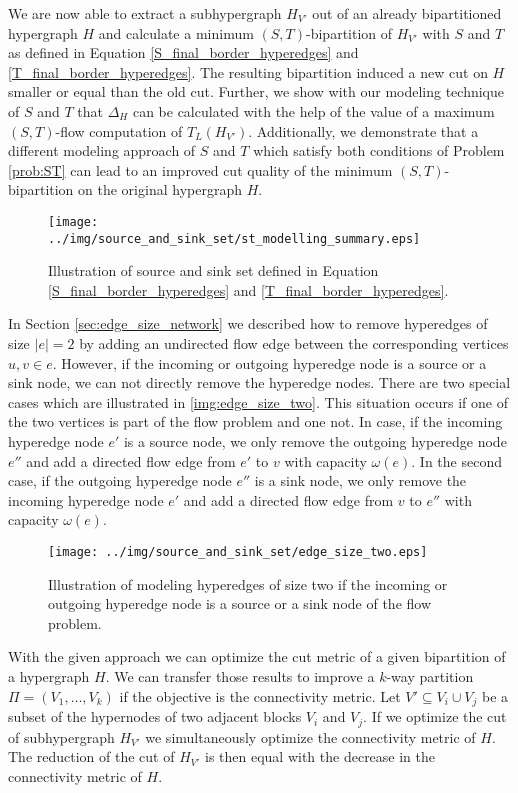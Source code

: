 We are now able to extract a subhypergraph $H_{V'}$ out of an already bipartitioned hypergraph $H$ and
calculate a minimum $(S,T)$-bipartition of $H_{V'}$ with $S$ and $T$ as defined
in Equation \ref{S_final_border_hyperedges} and \ref{T_final_border_hyperedges}. The resulting
bipartition induced a new cut on $H$ smaller or equal than the old cut. Further, we show with our
modeling technique of $S$ and $T$ that $\Delta_H$ can be calculated with the help of the value 
of a maximum $(S,T)$-flow computation of $T_L(H_{V'})$. Additionally, we demonstrate that a different
modeling approach of $S$ and $T$ which satisfy both conditions of Problem \ref{prob:ST} can lead to
an improved cut quality of the minimum $(S,T)$-bipartition on the original hypergraph $H$.

\begin{figure}[ht!]
\centering
\texttt{[image: ../img/source\_and\_sink\_set/st\_modelling\_summary.eps]}
\caption{Illustration of source and sink set  defined in Equation \ref{S_final_border_hyperedges}
         and \ref{T_final_border_hyperedges}. }
\label{img:st_modelling_summary}
\end{figure}
In Section \ref{sec:edge_size_network} we described how to remove hyperedges of size $|e| = 2$ 
by adding an undirected flow edge between the corresponding vertices $u,v \in e$. However, if
the incoming or outgoing hyperedge node is a source or a sink node, we can not directly
remove the hyperedge nodes. There are two special cases which are illustrated
in \autoref{img:edge_size_two}. This situation occurs if one of the two vertices is part
of the flow problem and one not. In case, if the incoming hyperedge node $e'$ is a source node, 
we only remove the outgoing hyperedge node $e''$ and add a directed flow edge from $e'$ 
to $v$ with capacity $\omega(e)$. In the second case, if the outgoing hyperedge node $e''$ is
a sink node, we only remove the incoming hyperedge node $e'$ and add a directed flow edge from
$v$ to $e''$ with capacity $\omega(e)$.
\begin{figure}[ht!]
\centering
\texttt{[image: ../img/source\_and\_sink\_set/edge\_size\_two.eps]}
\caption{Illustration of modeling hyperedges of size two if the incoming or outgoing
         hyperedge node is a source or a sink node of the flow problem.}
\label{img:edge_size_two}
\end{figure}

With the given approach we can optimize the cut metric of a given
bipartition of a hypergraph $H$. We can transfer those results to improve
a $k$-way partition $\Pi = (V_1,\ldots,V_k)$ if the objective is the connectivity
metric. Let $V' \subseteq V_i \cup V_j$ be a subset of the hypernodes of two adjacent
blocks $V_i$ and $V_j$. If we optimize the cut of
subhypergraph $H_{V'}$ we simultaneously optimize the connectivity metric of $H$.
The reduction of the cut of $H_{V'}$ is then equal with the decrease in
the connectivity metric of $H$.

